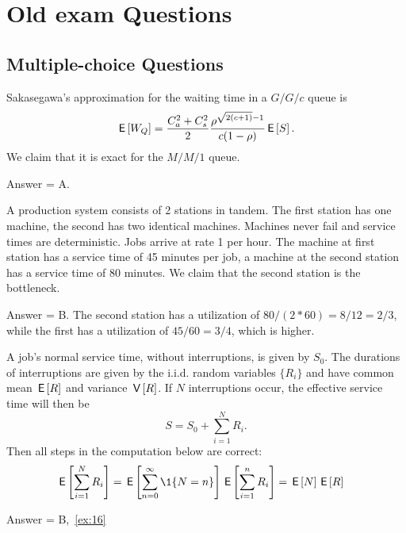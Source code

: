 \section{Old exam Questions}

\subsection{Multiple-choice Questions}

\begin{exercise}[201807]
Sakasegawa's approximation for the waiting time in a $G/G/c$ queue is 
\begin{equation*}
 \,\mathsf{E}\left[W_Q\right] = \frac{C_a^2+C_s^2}2 \frac{\rho^{\sqrt{2(c+1)}-1}}{c(1-\rho)} \,\mathsf{E}\left[S\right].
\end{equation*}
We claim that it is exact for the $M/M/1$ queue.
\begin{solution}
Answer = A.
\end{solution}
\end{exercise}

\begin{exercise}[201807]
 A production system consists of 2 stations in tandem. The first station has one machine, the second has two identical machines. Machines never fail and service times are deterministic. Jobs arrive at rate 1 per hour. The machine at first station has a service time of 45 minutes per job, a machine at the second station has a service time of 80 minutes. We claim that the second station is the bottleneck. 
\begin{solution}
Answer = B. The second station has a utilization of $80/(2*60) = 8/12 = 2/3$, while the first has a utilization of $45/60 = 3/4$, which is higher.
\end{solution}
\end{exercise}


\begin{exercise}[201904]
 A job's normal service time, without interruptions, is given by $S_0$.
 The durations of interruptions are given by the i.i.d.
 random variables $\{R_i\}$ and have common mean $\,\mathsf{E}\left[R\right]$ and variance $\,\mathsf{V}\left[R\right]$.
 If $N$ interruptions occur, the effective service time will then be
\begin{equation*}
S= S_0 + \sum_{i=1}^N R_i.
\end{equation*}
Then all steps in the computation below are correct: 
\begin{align*}
 \E{\sum_{i=1}^N R_i} 
&= \E{ \sum_{n=0}^\infty \1{N=n}} \E{ \sum_{i=1}^n R_i } = \E N \E R
\end{align*}
\begin{solution} Answer = B,~\cref{ex:16}
\end{solution}
\end{exercise}


